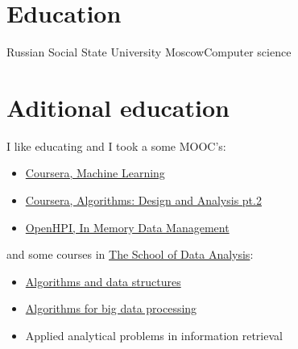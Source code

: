 \documentclass[xetex]{moderncv}
\begin{document}
\pagebreak

\section{Education}
 {Russian Social State University} {Moscow}{}{Computer science}

\section {Aditional education}

I like educating and I took a some MOOC's:  
\begin{itemize}
\item \href{https://www.dropbox.com/s/ey4kpuspil6ez54/Statement\%20of\%20Accomplishment.pdf}{Coursera, Machine Learning }
\item \href{https://www.dropbox.com/s/ot8hvdck28tyoj4/AlgoDA2.pdf}{Coursera,  Algorithms: Design and Analysis pt.2 }
\item \href{https://www.dropbox.com/s/ikqocsfb94sot51/in_memory_data_management_certificate_full_15656.pdf}{OpenHPI, In Memory Data Management }
\end{itemize}
and some courses in \href{http://shad.yandex.ru/?ncrnd=6964}{The School of Data Analysis}:
\begin{itemize}
\item \href{http://shad.yandex.ru/program/algorithms1.xml}{ Algorithms and data structures}
\item \href{http://shad.yandex.ru/program/algorithms3.xml}{ Algorithms for big data processing}
\item Applied analytical problems in information retrieval
\end{itemize} 
\end{document}
